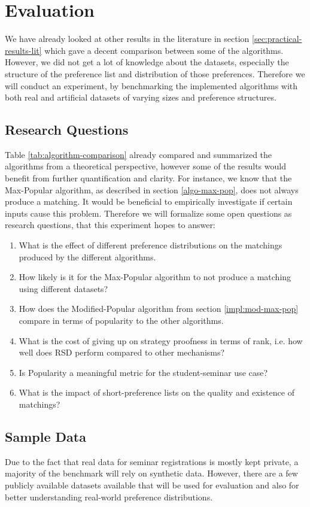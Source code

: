 \section{Evaluation}\label{sec:evaluation}
We have already looked at other results in the literature in section \ref{sec:practical-results-lit} which gave a decent comparison between some of the algorithms. However, we did not get a lot of knowledge about the datasets, especially the structure of the preference list and distribution of those preferences. Therefore we will conduct an experiment, by benchmarking the implemented algorithms with both real and artificial datasets of varying sizes and preference structures.

\subsection{Research Questions}
Table \ref{tab:algorithm-comparison} already compared and summarized the algorithms from a theoretical perspective, however some of the results would benefit from further quantification and clarity. For instance, we know that the Max-Popular algorithm, as described in section \ref{algo-max-pop}, does not always produce a matching. It would be beneficial to empirically investigate if certain inputs cause this problem. Therefore we will formalize some open questions as research questions, that this experiment hopes to answer:
\begin{enumerate}
    \item What is the effect of different preference distributions on the matchings produced by the different algorithms.
    \item How likely is it for the Max-Popular algorithm to not produce a matching using different datasets?
    \item How does the Modified-Popular algorithm from section \ref{impl:mod-max-pop} compare in terms of popularity to the other algorithms.
    \item What is the cost of giving up on strategy proofness in terms of rank, i.e. how well does RSD perform compared to other mechanisms?
    \item Is Popularity a meaningful metric for the student-seminar use case?
    \item What is the impact of short-preference lists on the quality and existence of matchings?
\end{enumerate}

\subsection{Sample Data}
Due to the fact that real data for seminar registrations is mostly kept private, a majority of the benchmark will rely on synthetic data. However, there are a few publicly available datasets available that will be used for evaluation and also for better understanding real-world preference distributions.

